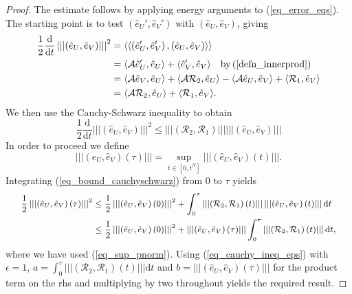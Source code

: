 \documentclass[12pt,a4paper]{article}
\numberwithin{equation}{section}
\theoremstyle{definition}
\newcommand{\pnorm}[1]{\left|\left|\left|#1\right|\right|\right|}
\newcommand{\innerprod}[1]{\langle\langle#1\rangle\rangle}
\newcommand{\innerprodsingle}[1]{\langle#1\rangle}
\newcommand{\qp}[1]{\left(#1\right)}
\newcommand{\qb}[1]{\left[#1\right]}
\begin{document}
\begin{proof}
The estimate follows by applying energy arguments to (\ref{eq_error_eqs}).  The starting point is to test $\qp{\hat{e}_U', \hat{e}_V'}$ with $\qp{\hat{e}_U, \hat{e}_V}$, giving
\begin{equation}
\begin{aligned}
\frac{1}{2}\frac{\mathrm{d}}{\mathrm{d}t}\pnorm{\qp{\hat{e}_U,\hat{e}_V}}^2
    &=\innerprod{\qp{\hat{e}_U', \hat{e}_V'}, \qp{\hat{e}_U, \hat{e}_V}}\\
    &=\innerprodsingle{\mathcal{A}\hat{e}_U',\hat{e}_U}+\innerprodsingle{\hat{e}_V',\hat{e}_V}\quad \text{by}\qp{\ref{defn_innerprod}}\\
    &=\innerprodsingle{\mathcal{A}\hat{e}_V,\hat{e}_U}
    +\innerprodsingle{\mathcal{A}\mathcal{R}_2,\hat{e}_U}
    -\innerprodsingle{\mathcal{A}\hat{e}_U,\hat{e}_V}
    +\innerprodsingle{\mathcal{R}_1,\hat{e}_V}\\
    &=\innerprodsingle{\mathcal{A}\mathcal{R}_2,\hat{e}_U}
    + \innerprodsingle{\mathcal{R}_1,\hat{e}_V}.
\end{aligned}
\end{equation}
We then use the Cauchy-Schwarz inequality to obtain
\begin{equation}\label{eq_bound_cauchyschwarz}
\frac{1}{2}\frac{\mathrm{d}}{\mathrm{d}t}\pnorm{\qp{\hat{e}_U,\hat{e}_V}}^2
  \leq  \pnorm{\qp{\mathcal{R}_2,\mathcal{R}_1}} \pnorm{\qp{\hat{e}_U,\hat{e}_V}}
\end{equation}
In order to proceed we define
\begin{equation}\label{eq_sup_pnorm}
\pnorm{\qp{\hat{e}_U, \hat{e}_V}\qp{\tau}}=\sup_{t\in\qb{0,t^N}}\pnorm{\qp{\hat{e}_U, \hat{e}_V}\qp{t}}.
\end{equation}
Integrating (\ref{eq_bound_cauchyschwarz}) from $0$ to $\tau$ yields
\begin{equation}
\small
\begin{aligned}
\frac{1}{2}\pnorm{\qp{\hat{e}_U, \hat{e}_V}\qp{\tau}}^2&\leq
\frac{1}{2}\pnorm{\qp{\hat{e}_U, \hat{e}_V}\qp{0}}^2
+\int_0^\tau\pnorm{\qp{\mathcal{R}_2,\mathcal{R}_1}\qp{t}} \pnorm{\qp{\hat{e}_U,\hat{e}_V}\qp{t}}\mathrm{d}t\\
&\leq \frac{1}{2}\pnorm{\qp{\hat{e}_U, \hat{e}_V}\qp{0}}^2
+\pnorm{\qp{\hat{e}_U,\hat{e}_V}\qp{\tau}}\int_0^\tau\pnorm{\qp{\mathcal{R}_2,\mathcal{R}_1}\qp{t}} \mathrm{d}t,
\end{aligned}
\end{equation}
where we have used (\ref{eq_sup_pnorm}).
Using (\ref{eq_cauchy_ineq_eps}) with $\epsilon=1$, $a=\int_0^\tau\pnorm{\qp{\mathcal{R}_2,\mathcal{R}_1}\qp{t}} \mathrm{d}t$ and $b=\pnorm{\qp{\hat{e}_U,\hat{e}_V}\qp{\tau}}$ for the product term on the rhs and multiplying by two throughout yields the required result.
\end{proof}
\end{document}
